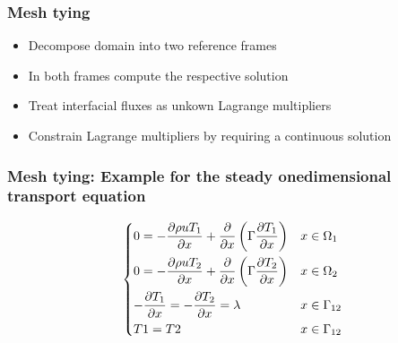 \documentclass[10pt,xcolor=dvipsnames]{beamer}
\begin{document}
\begin{frame}[t]
\frametitle{Mesh tying}
\vfill
  \begin{itemize}
    \item Decompose domain into two reference frames
    \item In both frames compute the respective solution
    \item Treat interfacial fluxes as unkown Lagrange multipliers
    \item Constrain Lagrange multipliers by requiring a continuous solution
  \end{itemize}
\end{frame}

\begin{frame}
\frametitle{Mesh tying: Example for the steady onedimensional transport equation}
 \begin{equation*}
 \begin{dcases}
  0 = -\frac{\partial \rho u T_1}{\partial x} + \frac{\partial}{\partial x}\left(\Gamma \frac{\partial T_1 }{\partial x}\right) & x\in\Omega_1\\
  0 = -\frac{\partial \rho u T_2}{\partial x} + \frac{\partial}{\partial x}\left(\Gamma \frac{\partial T_2 }{\partial x}\right) & x\in\Omega_2\\
  -\frac{\partial T_1}{\partial x} = -\frac{\partial T_2}{\partial x} = \lambda & x\in\Gamma_{12}\\
  T1 = T2 & x\in\Gamma_{12}
 \end{dcases}
 \end{equation*}
\end{frame}
\end{document}
